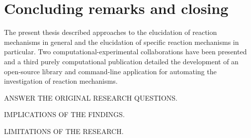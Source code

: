 \chapter{Concluding remarks and closing}%
\label{ch:conclusion}

The present thesis described approaches to the elucidation of reaction
mechanisms in general and the elucidation of specific reaction mechanisms in
particular.
Two computational-experimental collaborations have been presented and a third
purely computational publication detailed the development of an open-source
library and command-line application for automating the investigation of
reaction mechanisms.

ANSWER THE ORIGINAL RESEARCH QUESTIONS.\@

IMPLICATIONS OF THE FINDINGS.\@

LIMITATIONS OF THE RESEARCH.\@
